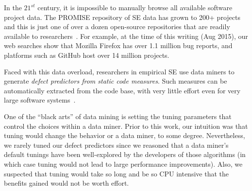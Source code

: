 \documentclass{sig-alternative}
\begin{document}
In the $21^{st}$ century, it is  impossible
to manually browse all  available software project
data. The PROMISE repository of SE data has grown to 200+ projects~\cite{promise15}
and this is just one of over a dozen open-source repositories
that are readily available to researchers~\cite{rod12}.
For example, at the time of this writing (Aug  2015), our web searches show that Mozilla Firefox has over 1.1 million bug reports, and platforms such as GitHub host over 14 million projects. 

Faced with this data overload,
researchers in empirical SE
use  data miners  to generate 
{\em defect predictors from static code measures}.
Such   measures can be
automatically extracted from the code base, with very little effort
even for very large software systems~\cite{nagappan05}. 

One of the ``black arts'' of data mining is setting the tuning
parameters that control  the choices within a data miner.
Prior to this work, our intuition was that tuning would change the behavior or a data miner, to some degree. Nevertheless, we rarely tuned our  defect predictors 
since we reasoned
that a data miner's default tunings have been well-explored by the developers of those algorithms (in which case
tuning would not lead to large performance improvements).
Also, we suspected that
tuning would take so long and be so CPU intensive that the benefits gained   would not be worth effort.
\end{document}

